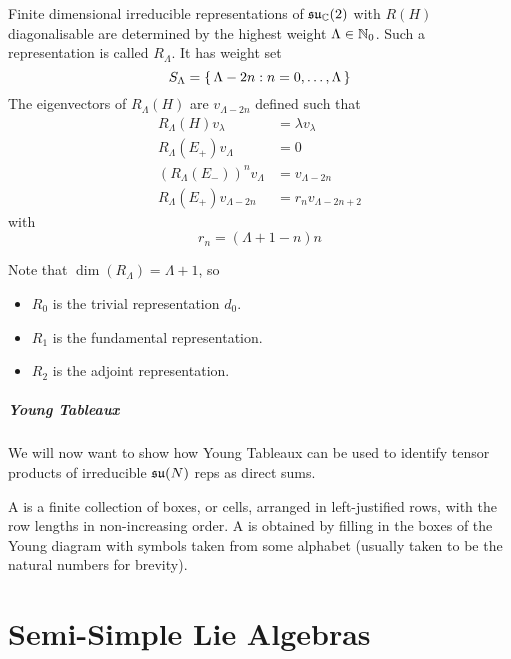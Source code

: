 \documentclass{article}
\begin{document}
\begin{theorem}
	Finite dimensional irreducible representations of $\mathfrak{su}_{\mathbb{C}}(2)$ with $R(H)$ diagonalisable are determined by the highest weight $\Lambda\in\mathbb{N}_0$. Such a representation is called $R_\Lambda$. It has weight set 
	\[
	S_\Lambda=\set{  \Lambda-2n : n=0,\dots,\Lambda  }
	\]
	The eigenvectors of $R_\Lambda(H)$ are $v_{\Lambda-2n}$ defined such that 
	\begin{align*}
		R_\Lambda(H) v_\lambda &= \lambda v_\lambda \\
		R_\Lambda(E_+) v_\Lambda &= 0 \\
		\left(R_\Lambda(E_-)\right)^n v_{\Lambda} &= v_{\Lambda-2n} \\
		R_\Lambda(E_+) v_{\Lambda-2n} &= r_n v_{\Lambda-2n+2}
	\end{align*}
	with 
	\[
	r_n=(\Lambda+1-n)n
	\]
\end{theorem}
Note that $\dim(R_\Lambda)=\Lambda+1$, so 
\begin{itemize}
	\item $R_0$ is the trivial representation $d_0$.
	\item $R_1$ is the fundamental representation.
	\item $R_2$ is the adjoint representation. 
\end{itemize}

\subsubsection{Young Tableaux}
We will now want to show how Young Tableaux can be used to identify tensor products of irreducible $\mathfrak{su}(N)$ reps as direct sums. 

\begin{definition}
	A  is a finite collection of boxes, or cells, arranged in left-justified rows, with the row lengths in non-increasing order. A  is obtained by filling in the boxes of the Young diagram with symbols taken from some alphabet (usually taken to be the natural numbers for brevity). 
\end{definition}

\part{Semi-Simple Lie Algebras}
\end{document}
